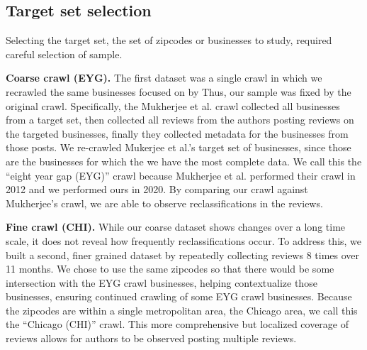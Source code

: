 \subsection{Target set selection} \label{subsec:rim:target_set}
Selecting the target set, the set of zipcodes or businesses to study, required careful selection of sample.


\textbf{Coarse crawl (EYG).} 
The first dataset was a single crawl in which we recrawled the same businesses focused on by \citet{mukherjee2013yelp} Thus, our sample was fixed by the original crawl. Specifically, the Mukherjee et al. crawl collected all businesses from a target set, then collected all reviews from the authors posting reviews on the targeted businesses, finally they collected metadata for the businesses from those posts. We re-crawled Mukerjee et al.'s target set of businesses, since those are the businesses for which the we have the most complete data. We call this the ``eight year gap (EYG)'' crawl because Mukherjee et al. performed their crawl in 2012 and we performed ours in 2020. By comparing our crawl against Mukherjee's crawl, we are able to observe reclassifications in the reviews.


\textbf{Fine crawl (CHI).}
While our coarse dataset shows changes over a long time scale, it does not reveal how frequently reclassifications occur. To address this, we built a second, finer grained dataset by repeatedly collecting reviews 8 times over 11 months. We chose to use the same zipcodes so that there would be some intersection with the EYG crawl businesses, helping contextualize those businesses, ensuring continued crawling of some EYG crawl businesses. Because the zipcodes are within a single metropolitan area, the Chicago area, we call this the ``Chicago (CHI)'' crawl. This more comprehensive but localized coverage of reviews allows for authors to be observed posting multiple reviews.

